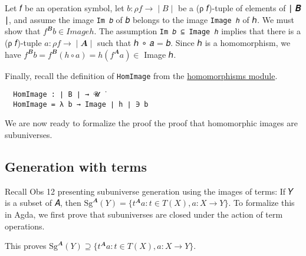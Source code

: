 \documentclass[sigplan,screen]{acmart}
\newcommand\homomorphismsmodule{\href{https://gitlab.com/ualib/ualib.gitlab.io/-/blob/master/homomorphisms.lagda.rst}{homomorphisms module}\xspace}
\begin{document}
Let 𝑓 be an operation symbol, let \(b : ρ f → ∣ B ∣\) be a (ρ 𝑓)-tuple
of elements of ∣ 𝑩 ∣, and assume the image \texttt{Im\ 𝑏} of 𝑏 belongs
to the image \texttt{Image\ ℎ} of ℎ. We must show that
\(f^𝑩 b ∈ Image h\). The assumption \texttt{Im\ 𝑏\ ⊆\ Image\ ℎ} implies
that there is a (ρ 𝑓)-tuple \(𝑎 : ρ f → ∣ 𝑨 ∣\) such that ℎ ∘ 𝑎 = 𝑏.
Since ℎ is a homomorphism, we have
\(f^𝑩 𝑏  = f^𝑩 (ℎ ∘ 𝑎) = ℎ (f^𝑨 𝑎) ∈\) Image ℎ.

Finally, recall the definition of \texttt{HomImage} from the \homomorphismsmodule.
\begin{verbatim}
  HomImage : ∣ B ∣ → 𝓤 ̇
  HomImage = λ b → Image ∣ h ∣ ∋ b
\end{verbatim}
We are now ready to formalize the proof the proof that homomorphic images are subuniverses.
\begin{code}\end{code}

\subsection{Generation with terms}\label{generation-with-terms}
Recall Obs 12 presenting subuniverse generation using the images of terms: If 𝑌 is a subset of 𝐴, then \(\mathrm{Sg}^𝑨(Y) = \{t^𝑨 a : t ∈ T(X), a : X → Y\}\). To formalize this in Agda, we first prove that subuniverses are closed under the action of term operations.
\begin{code}\end{code}
This proves \(\mathrm{Sg}^𝑨(Y) ⊇ \{ t^𝑨 a : t ∈ 𝑇(𝑋), a : 𝑋 → 𝑌 \}\).
\end{document}
